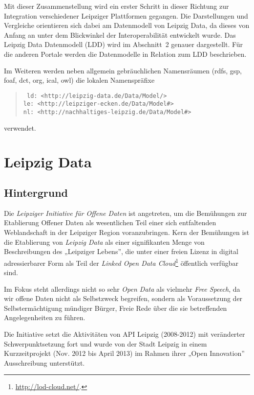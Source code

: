 \documentclass[a4paper,11pt]{article}
\begin{document}
Mit dieser Zusammenstellung wird ein erster Schritt in dieser Richtung zur
Integration verschiedener Leipziger Plattformen gegangen.  Die Darstellungen
und Vergleiche orientieren sich dabei am Datenmodell von Leipzig Data, da
dieses von Anfang an unter dem Blickwinkel der Interoperabilität entwickelt
wurde.  Das Leipzig Data Datenmodell (LDD) wird im Abschnitt~2 genauer
dargestellt. Für die anderen Portale werden die Datenmodelle in Relation zum
LDD beschrieben.

Im Weiteren werden neben allgemein gebräuchlichen Namensräumen (rdfs, gsp,
foaf, dct, org, ical, owl) die lokalen Namenspräfixe
\begin{quote}\tt
  ld: <http://leipzig-data.de/Data/Model/> \\ 
  le: <http://leipziger-ecken.de/Data/Model\#> \\ 
  nl: <http://nachhaltiges-leipzig.de/Data/Model\#>
\end{quote}
verwendet.
\newpage

\section{Leipzig Data}

\subsection{Hintergrund}

Die \emph{Leipziger Initiative für Offene Daten} ist angetreten, um die
Bemühungen zur Etablierung Offener Daten als wesentlichen Teil einer sich
entfaltenden Weblandschaft in der Leipziger Region voranzubringen.  Kern der
Bemühungen ist die Etablierung von \emph{Leipzig Data} als einer signifikanten
Menge von Beschreibungen des „Leipziger Lebens”, die unter einer freien Lizenz
in digital adressierbarer Form als Teil der \emph{Linked Open Data
  Cloud}\footnote{\url{http://lod-cloud.net/}.} öffentlich verfügbar sind.

Im Fokus steht allerdings nicht so sehr \emph{Open Data} als vielmehr
\emph{Free Speech}, da wir offene Daten nicht als Selbstzweck begreifen,
sondern als Voraussetzung der Selbstermächtigung mündiger Bürger, Freie Rede
über die sie betreffenden Angelegenheiten zu führen.

Die Initiative setzt die Aktivitäten von API Leipzig (2008-2012) mit
veränderter Schwerpunktsetzung fort und wurde von der Stadt Leipzig in einem
Kurzzeitprojekt (Nov. 2012 bis April 2013) im Rahmen ihrer „Open Innovation”
Ausschreibung unterstützt.
 
\end{document}
